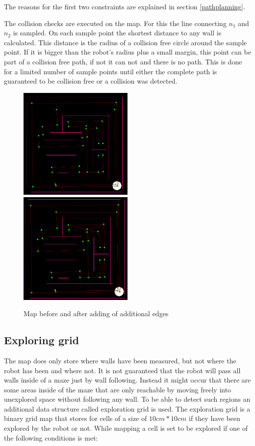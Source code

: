 The reasons for the first two constraints are explained in section \ref{pathplanning}. 

The collision checks are executed on the map. For this the line connecting $n_1$ and $n_2$ is sampled. On each sample point the shortest distance to any wall is calculated. This distance is the radius of a collision free circle around the sample point. If it is bigger than the robot's radius plus a small margin, this point can be part of a collision free path, if not it can not and there is no path. This is done for a limited number of sample points until either the complete path is guaranteed to be collision free or a collision was detected.

\begin{figure}
\includegraphics[width=0.5\textwidth]{figures/map_no_edges.png}
\includegraphics[width=0.5\textwidth]{figures/map_edges.png}
\caption{Map before and after adding of additional edges}
\end{figure}

\subsection{Exploring grid}
The map does only store where walls have been measured, but not where the robot 
has been and where not. It is not guaranteed that the robot will pass all walls inside
of a maze just by wall following. Instead it might occur that there are some areas inside of the
maze that are only reachable by moving freely into unexplored space without following any wall.
To be able to detect such regions an additional data structure called exploration grid is used.
The exploration grid is a binary grid map that stores for cells of a size of
$10cm*10cm$ if they have been explored by the robot or not.
While mapping a cell is set to be explored if one of the following conditions is met:


